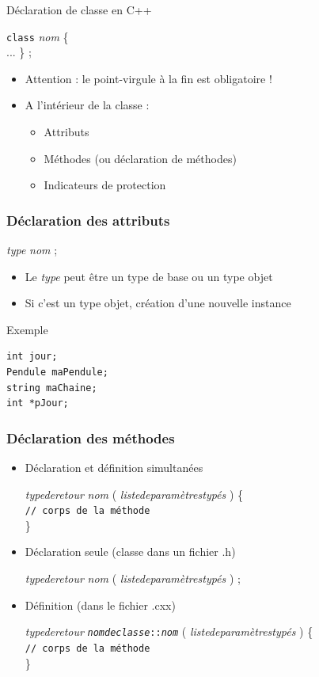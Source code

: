 \begin{frame}{Déclaration de classe en C++}
\begin{definition}
\texttt{class} \textit{nom} \{ \\
...
\} ;
\end{definition}

\begin{itemize}
\item Attention : le point-virgule à la fin est obligatoire !
\item A l'intérieur de la classe :
\begin{itemize}
\item Attributs
\item Méthodes (ou déclaration de méthodes)
\item Indicateurs de protection
\end{itemize}
\end{itemize}
\end{frame}

\begin{frame}[fragile]
\frametitle{Déclaration des attributs}
\begin{definition}
\textit{type} \textit{nom}  ;
\end{definition}
\begin{itemize}
\item Le \textit{type} peut être un type de base ou un type objet
\item Si c'est un type objet, création d'une nouvelle instance
\end{itemize}
\begin{exampleblock}{Exemple}
\begin{lstlisting}
int jour;
Pendule maPendule;
string maChaine;
int *pJour;
\end{lstlisting}
\end{exampleblock}
\end{frame}

\begin{frame}[fragile]
\frametitle{Déclaration des méthodes}
\begin{itemize}
\item Déclaration et définition simultanées
\begin{definition}
\textit{typederetour} \textit{nom} ( \textit{listedeparamètrestypés} ) \{ \\
\texttt{// corps de la méthode} \\
\}
\end{definition}
\item Déclaration seule (classe dans un fichier .h)
\begin{definition}
\textit{typederetour} \textit{nom} ( \textit{listedeparamètrestypés} ) ;
\end{definition}
\item Définition (dans le fichier .cxx)
\begin{definition}
\textit{typederetour} \texttt{\textit{nomdeclasse}::\textit{nom}} ( \textit{listedeparamètrestypés} ) \{ \\
\texttt{// corps de la méthode} \\
\}
\end{definition}
\end{itemize}
\end{frame}

